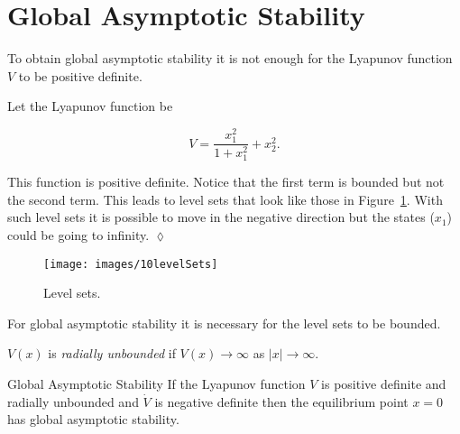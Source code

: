 \mainmatter%
\setcounter{page}{1}

\lectureseries[\course]{\course}

\date{February 4, 2010}

\setaddress%

\setcounter{lecture}{9}
\setcounter{chapter}{9}


\section{Global Asymptotic Stability}
To obtain global asymptotic stability it is not enough for the Lyapunov function $V$ to be positive definite.

\begin{example}
Let the Lyapunov function be

\begin{equation*}
V = \frac{x_1^2}{1+x_1^2} + x_2^2.
\end{equation*}

This function is positive definite.
Notice that the first term is bounded but not the second term.
This leads to level sets that look like those in Figure~\ref{fig:10levelSets}.
With such level sets it is possible to move in the negative direction but the states ($x_1$) could be going to infinity.
$\lozenge$
\end{example}

\begin{figure}[ht!]
\centering
\texttt{[image: images/10levelSets]}
\caption{Level sets.}%
\label{fig:10levelSets}
\end{figure}

For global asymptotic stability it is necessary for the level sets to be bounded.

\begin{definition}
$V(x)$ is \textit{radially unbounded} if $V(x)\to\infty$ as $|x|\to\infty$.
\end{definition}

\begin{theorem}{Global Asymptotic Stability}
If the Lyapunov function $V$ is positive definite and radially unbounded and $\dot{V}$ is negative definite then the equilibrium point $x=0$ has global asymptotic stability.
\end{theorem}


